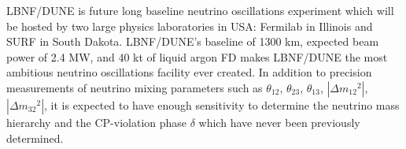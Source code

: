 




LBNF/DUNE is future long baseline neutrino oscillations experiment which will be hosted by two large physics laboratories in USA: Fermilab in Illinois and SURF in South Dakota. LBNF/DUNE's baseline of 1300 km, expected beam power of 2.4 MW, and 40 kt of liquid argon FD makes LBNF/DUNE the most ambitious neutrino oscillations facility ever created. In addition to precision measurements of neutrino mixing parameters such as $\theta_{12}$, $\theta_{23}$, $\theta_{13}$, $|\Delta{m_{12}}^2|$, $|\Delta{m_{32}}^2|$, it is expected to have enough sensitivity to determine the neutrino mass hierarchy and the CP-violation phase $\delta$ which have never been previously determined.\\ \\
